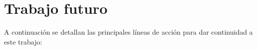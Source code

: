 





\section{Trabajo futuro}

A continuación se detallan las principales líneas de acción para dar continuidad a este trabajo:

